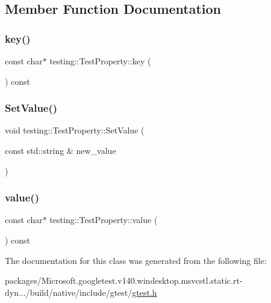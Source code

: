 \subsection{Member Function Documentation}
\mbox{\label{classtesting_1_1_test_property_ad60435d4ad04ac030487d8998fc61c5f}} 
\subsubsection{\texorpdfstring{key()}{key()}}
{\footnotesize\ttfamily const char$\ast$ testing\+::\+Test\+Property\+::key (\begin{DoxyParamCaption}{ }\end{DoxyParamCaption}) const\hspace{0.3cm}{\ttfamily [inline]}}

\mbox{\label{classtesting_1_1_test_property_a377245335d9f614cd06d1650e3358e1d}} 
\subsubsection{\texorpdfstring{SetValue()}{SetValue()}}
{\footnotesize\ttfamily void testing\+::\+Test\+Property\+::\+Set\+Value (\begin{DoxyParamCaption}\item[{const std\+::string \&}]{new\+\_\+value }\end{DoxyParamCaption})\hspace{0.3cm}{\ttfamily [inline]}}

\mbox{\label{classtesting_1_1_test_property_ad423a07af33c88b0c9ed33ee74815a63}} 
\subsubsection{\texorpdfstring{value()}{value()}}
{\footnotesize\ttfamily const char$\ast$ testing\+::\+Test\+Property\+::value (\begin{DoxyParamCaption}{ }\end{DoxyParamCaption}) const\hspace{0.3cm}{\ttfamily [inline]}}



The documentation for this class was generated from the following file\+:\begin{DoxyCompactItemize}
\item 
packages/\+Microsoft.\+googletest.\+v140.\+windesktop.\+msvcstl.\+static.\+rt-\/dyn.../build/native/include/gtest/\mbox{\hyperlink{gtest_8h}{gtest.\+h}}\end{DoxyCompactItemize}
